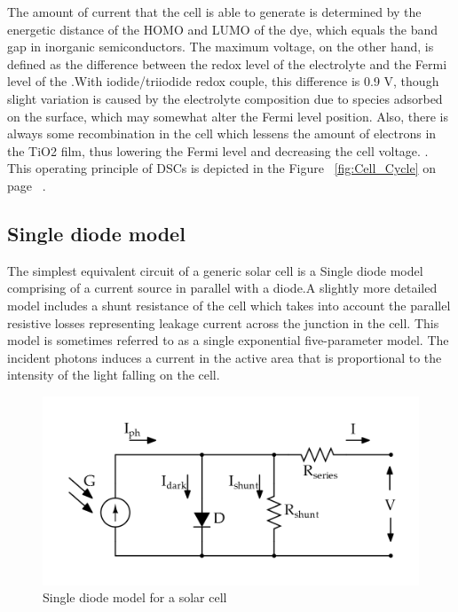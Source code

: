 The amount of current that the cell is able to generate is determined by the energetic distance of the \ac{HOMO} and \ac{LUMO} of the dye, which equals the band gap in inorganic semiconductors. The maximum voltage, on the other hand, is defined as the difference between the redox level of the electrolyte and the Fermi level of the .With iodide/triiodide redox couple, this difference is 0.9 V, though slight variation is caused by the electrolyte composition due to species adsorbed on the  surface, which may somewhat alter the Fermi level position. Also, there is always some recombination in the cell which lessens the amount of electrons in the TiO2 film, thus lowering the Fermi level and decreasing the cell voltage. \cite{toivola2010dye}.  This operating principle of \ac{DSCs} is depicted in the Figure ~\ref{fig:Cell_Cycle} on page ~\pageref{fig:Cell_Cycle}. \\


  
  
\subsection{Single diode model}\label{sec:SDM}
The simplest equivalent circuit of a generic solar cell is a Single diode model comprising of a current source in parallel with a diode.A slightly more detailed model includes a shunt resistance of the cell which takes into account the parallel resistive losses representing leakage current across the junction in the cell. This model is sometimes referred to as a single exponential five-parameter model\cite{vignati2012solutions}. The incident photons induces a current in the active area that is proportional to the intensity of the light falling on the cell.

 \begin{figure}[H]
  \begin{center}
  \includegraphics[width=\textwidth]{images/simplified_single_diode_model}
  \caption{ Single diode model for a solar cell }
  \label{fig:EQu_cell}
  \end{center}
  \end{figure}
  
